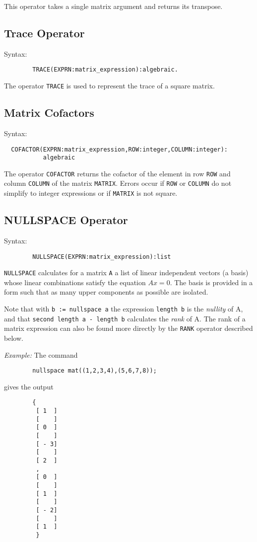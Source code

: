 This operator takes a single matrix argument and returns its transpose.

\subsection{Trace Operator}
Syntax:
\begin{verbatim}
        TRACE(EXPRN:matrix_expression):algebraic.
\end{verbatim}
The operator {\tt TRACE} is used to represent the trace of a square matrix.

\subsection{Matrix Cofactors}
Syntax:
\begin{verbatim}
  COFACTOR(EXPRN:matrix_expression,ROW:integer,COLUMN:integer):
           algebraic
\end{verbatim}

The operator {\tt COFACTOR} returns the cofactor of the element in row
{\tt ROW} and column {\tt COLUMN} of the matrix {\tt MATRIX}.  Errors occur
if {\tt ROW} or {\tt COLUMN} do not simplify to integer expressions or if
{\tt MATRIX} is not square.

\subsection{NULLSPACE Operator}
Syntax:
\begin{verbatim}
        NULLSPACE(EXPRN:matrix_expression):list
\end{verbatim}
{\tt NULLSPACE} calculates for a matrix {\tt A} a list of linear
independent vectors (a basis) whose linear combinations satisfy the
equation $A x = 0$.  The basis is provided in a form such that as many
upper components as possible are isolated.

Note that with {\tt b := nullspace a} the expression {\tt length b} is the
{\em nullity\/} of A, and that {\tt second length a - length b} calculates the
{\em rank\/} of A.  The rank of a matrix expression can also be found more
directly by the {\tt RANK} operator described below.

{\it Example:} The command
\begin{verbatim}
        nullspace mat((1,2,3,4),(5,6,7,8));
\end{verbatim}
   gives the output

\begin{verbatim}
        {
         [ 1  ]
         [    ]
         [ 0  ]
         [    ]
         [ - 3]
         [    ]
         [ 2  ]
         ,
         [ 0  ]
         [    ]
         [ 1  ]
         [    ]
         [ - 2]
         [    ]
         [ 1  ]
         }
\end{verbatim}

